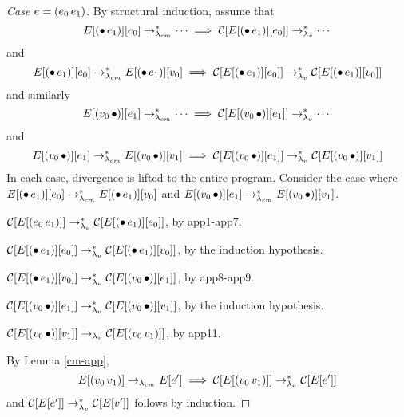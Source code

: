 \begin{proof}[Case $e=(e_0\,e_1)$]
By structural induction, assume that 
\[
E[(\bullet\,e_1)][e_0]\rightarrow_{\lambda_{cm}}^{*}\cdots\implies\mathcal{C}[E[(\bullet\,e_1)][e_0]]\rightarrow_{\lambda_v}^{*}\cdots
\]
and
\[
E[(\bullet\,e_1)][e_0]\rightarrow_{\lambda_{cm}}^{*} E[(\bullet\,e_1)][v_0]\implies\mathcal{C}[E[(\bullet\,e_1)][e_0]]\rightarrow_{\lambda_v}^{*}\mathcal{C}[E[(\bullet\,e_1)][v_0]]
\]
and similarly
\[
E[(v_0\,\bullet)][e_1]\rightarrow_{\lambda_{cm}}^{*}\cdots\implies\mathcal{C}[E[(v_0\,\bullet)][e_1]]\rightarrow_{\lambda_v}^{*}\cdots
\]
and
\[
E[(v_0\,\bullet)][e_1]\rightarrow_{\lambda_{cm}}^{*} E[(v_0\,\bullet)][v_1]\implies\mathcal{C}[E[(v_0\,\bullet)][e_1]]\rightarrow_{\lambda_v}^{*}\mathcal{C}[E[(v_0\,\bullet)][v_1]]
\]
In each case, divergence is lifted to the entire program. Consider the case where $E[(\bullet\,e_1)][e_0]\rightarrow_{\lambda_{cm}}^{*} E[(\bullet\,e_1)][v_0]$ and $E[(v_0\,\bullet)][e_1]\rightarrow_{\lambda_{cm}}^{*} E[(v_0\,\bullet)][v_1]$.

$\mathcal{C}[E[(e_0\,e_1)]]\rightarrow_{\lambda_v}^{*}\mathcal{C}[E[(\bullet\,e_1)][e_0]]$, by app1-app7.

$\mathcal{C}[E[(\bullet\,e_1)][e_0]]\rightarrow_{\lambda_v}^{*}\mathcal{C}[E[(\bullet\,e_1)][v_0]]$, by the induction hypothesis.

$\mathcal{C}[E[(\bullet\,e_1)][v_0]]\rightarrow_{\lambda_v}^{*}\mathcal{C}[E[(v_0\,\bullet)][e_1]]$, by app8-app9.

$\mathcal{C}[E[(v_0\,\bullet)][e_1]]\rightarrow_{\lambda_v}^{*}\mathcal{C}[E[(v_0\,\bullet)][v_1]]$, by the induction hypothesis.

$\mathcal{C}[E[(v_0\,\bullet)][v_1]]\rightarrow_{\lambda_v}\mathcal{C}[E[(v_0\,v_1)]]$, by app11.

By Lemma \ref{cm-app},
\[
E[(v_0\,v_1)]\rightarrow_{\lambda_{cm}} E[e']\implies\mathcal{C}[E[(v_0\,v_1)]]\rightarrow_{\lambda_v}^{*}\mathcal{C}[E[e']]
\]
and $\mathcal{C}[E[e']]\rightarrow_{\lambda_v}^{*}\mathcal{C}[E[v']]$ follows by induction.
\end{proof}

